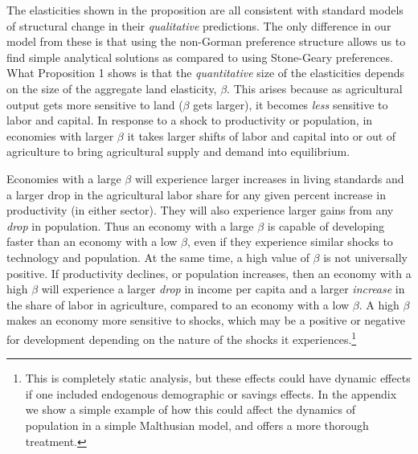 \documentclass[11pt]{article}
\begin{document}
\vspace{.3cm} The elasticities shown in the proposition are all consistent with standard models of structural change \citep{kp2001,Gollin:2007oq,Restuccia:2008hc,Gollin:2010ys,vollrath2011,Alvarez-Cuadrado:2011nx,hrv2014,duarte2010role} in their \textit{qualitative} predictions. The only difference in our model from these is that using the non-Gorman preference structure allows us to find simple analytical solutions as compared to using Stone-Geary preferences. What Proposition 1 shows is that the \textit{quantitative} size of the elasticities depends on the size of the aggregate land elasticity, $\beta$. This arises because as agricultural output gets more sensitive to land ($\beta$ gets larger), it becomes \textit{less} sensitive to labor and capital. In response to a shock to productivity or population, in economies with larger $\beta$ it takes larger shifts of labor and capital into or out of agriculture to bring agricultural supply and demand into equilibrium. 

Economies with a large $\beta$ will experience larger increases in living standards and a larger drop in the agricultural labor share for any given percent increase in productivity (in either sector). They will also experience larger gains from any \textit{drop} in population. Thus an economy with a large $\beta$ is capable of developing faster than an economy with a low $\beta$, even if they experience similar shocks to technology and population. At the same time, a high value of $\beta$ is not universally positive. If productivity declines, or population increases, then an economy with a high $\beta$ will experience a larger \textit{drop} in income per capita and a larger \textit{increase} in the share of labor in agriculture, compared to an economy with a low $\beta$. A high $\beta$ makes an economy more sensitive to shocks, which may be a positive or negative for development depending on the nature of the shocks it experiences.\footnote{This is completely static analysis, but these effects could have dynamic effects if one included endogenous demographic or savings effects. In the appendix we show a simple example of how this could affect the dynamics of population in a simple Malthusian model, and \citet{vollrath2011} offers a more thorough treatment.}
\end{document}
